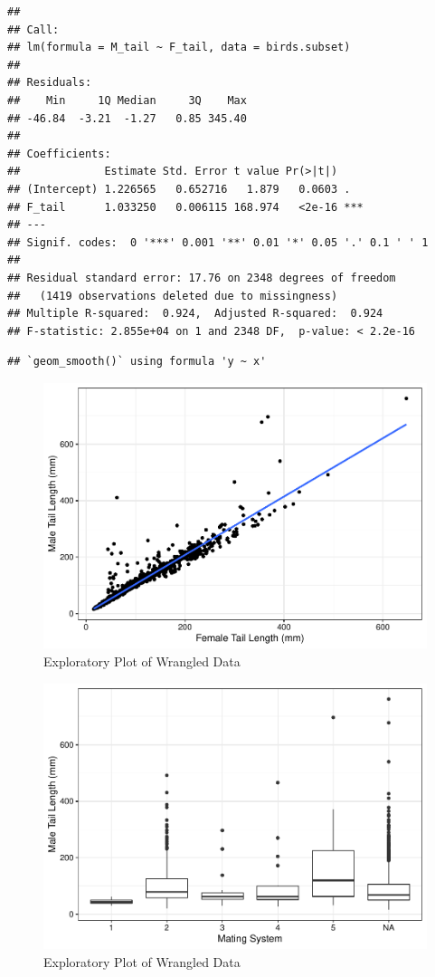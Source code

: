 \documentclass[
  12pt,
]{article}
\begin{document}
\begin{verbatim}
## 
## Call:
## lm(formula = M_tail ~ F_tail, data = birds.subset)
## 
## Residuals:
##    Min     1Q Median     3Q    Max 
## -46.84  -3.21  -1.27   0.85 345.40 
## 
## Coefficients:
##             Estimate Std. Error t value Pr(>|t|)    
## (Intercept) 1.226565   0.652716   1.879   0.0603 .  
## F_tail      1.033250   0.006115 168.974   <2e-16 ***
## ---
## Signif. codes:  0 '***' 0.001 '**' 0.01 '*' 0.05 '.' 0.1 ' ' 1
## 
## Residual standard error: 17.76 on 2348 degrees of freedom
##   (1419 observations deleted due to missingness)
## Multiple R-squared:  0.924,  Adjusted R-squared:  0.924 
## F-statistic: 2.855e+04 on 1 and 2348 DF,  p-value: < 2.2e-16
\end{verbatim}

\begin{verbatim}
## `geom_smooth()` using formula 'y ~ x'
\end{verbatim}

\begin{figure}
\centering
\includegraphics{Project_Code_files/figure-latex/r exploratory_plots_3-1.pdf}
\caption{Exploratory Plot of Wrangled Data}
\end{figure}

\begin{figure}
\centering
\includegraphics{Project_Code_files/figure-latex/r exploratory_plots_4-1.pdf}
\caption{Exploratory Plot of Wrangled Data}
\end{figure}
\end{document}
